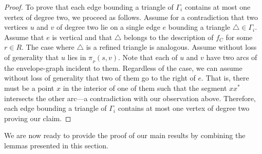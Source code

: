 \documentclass[a4paper, 11pt]{article}
\newcommand{\p}[3][P]{\ensuremath{\pi_{_{#1}}(#2, #3)}}
\begin{document}
\begin{proof}
To prove that each edge bounding a triangle of $\Gamma_i$ contains at most one vertex of degree two, we proceed as follows.
Assume for a contradiction that two vertices $u$ and $v$ of degree two lie on a single edge $e$ bounding a triangle $\triangle\in \Gamma_i$.
Assume that $e$ is vertical and that $\triangle$ belongs to the description of $f_C$ for some $r\in R$. 
The case where $\triangle$ is a refined triangle is analogous. Assume without loss of generality that $u$ lies in $\p{s}{v}$.
Note that each of $u$ and $v$ have two arcs of the envelope-graph incident to them.
Regardless of the case, we can assume without loss of generality that two of them go to the right of $e$. 
That is, there must be a point $x$ in the interior of one of them such that the segment $x x^*$ intersects the other arc---a contradiction with our observation above.
Therefore, each edge bounding a triangle of $\Gamma_i$ contains at most one vertex of degree two proving our claim.
\end{proof}

We are now ready to provide the proof of our main results by combining the lemmas presented in this section. 
\end{document}
